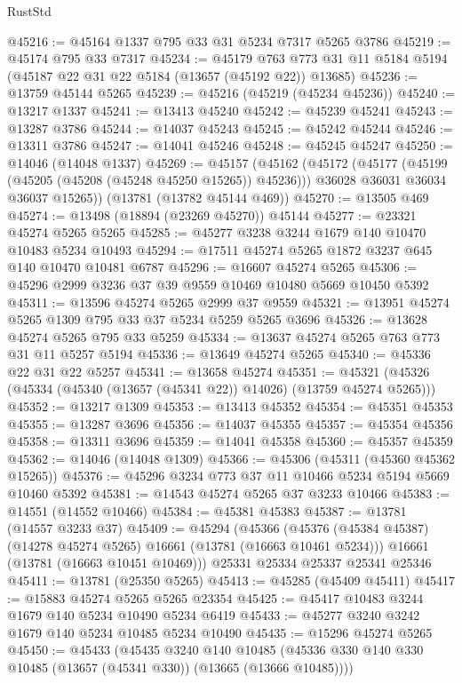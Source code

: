\begin{lexlean}{RustStd}
\begin{coremodule}
@45216 := @45164 @1337 @795 @33 @31 @5234 @7317 @5265 @3786
@45219 := @45174 @795 @33 @7317
@45234 := @45179
    @763
    @773
    @31
    @11
    @5184
    @5194
    (@45187 @22 @31 @22 @5184 (@13657 (@45192 @22)) @13685)
@45236 := @13759 @45144 @5265
@45239 := @45216 (@45219 (@45234 @45236))
@45240 := @13217 @1337
@45241 := @13413 @45240
@45242 := @45239 @45241
@45243 := @13287 @3786
@45244 := @14037 @45243
@45245 := @45242 @45244
@45246 := @13311 @3786
@45247 := @14041 @45246
@45248 := @45245 @45247
@45250 := @14046 (@14048 @1337)
@45269 := @45157
    (@45162
      (@45172
        (@45177 (@45199 (@45205 (@45208 (@45248 @45250 @15265)) @45236)))
        @36028
        @36031
        @36034
        @36037
        @15265))
    (@13781 (@13782 @45144 @469))
@45270 := @13505 @469
@45274 := @13498 (@18894 (@23269 @45270)) @45144
@45277 := @23321 @45274 @5265 @5265
@45285 := @45277 @3238 @3244 @1679 @140 @10470 @10483 @5234 @10493
@45294 := @17511 @45274 @5265 @1872 @3237 @645 @140 @10470 @10481 @6787
@45296 := @16607 @45274 @5265
@45306 := @45296 @2999 @3236 @37 @39 @9559 @10469 @10480 @5669 @10450 @5392
@45311 := @13596 @45274 @5265 @2999 @37 @9559
@45321 := @13951 @45274 @5265 @1309 @795 @33 @37 @5234 @5259 @5265 @3696
@45326 := @13628 @45274 @5265 @795 @33 @5259
@45334 := @13637 @45274 @5265 @763 @773 @31 @11 @5257 @5194
@45336 := @13649 @45274 @5265
@45340 := @45336 @22 @31 @22 @5257
@45341 := @13658 @45274
@45351 := @45321 (@45326 (@45334 (@45340 (@13657 (@45341 @22)) @14026) (@13759 @45274 @5265)))
@45352 := @13217 @1309
@45353 := @13413 @45352
@45354 := @45351 @45353
@45355 := @13287 @3696
@45356 := @14037 @45355
@45357 := @45354 @45356
@45358 := @13311 @3696
@45359 := @14041 @45358
@45360 := @45357 @45359
@45362 := @14046 (@14048 @1309)
@45366 := @45306 (@45311 (@45360 @45362 @15265))
@45376 := @45296 @3234 @773 @37 @11 @10466 @5234 @5194 @5669 @10460 @5392
@45381 := @14543 @45274 @5265 @37 @3233 @10466
@45383 := @14551 (@14552 @10466)
@45384 := @45381 @45383
@45387 := @13781 (@14557 @3233 @37)
@45409 := @45294
    (@45366
      (@45376 (@45384 @45387) (@14278 @45274 @5265) @16661 (@13781 (@16663 @10461 @5234)))
      @16661
      (@13781 (@16663 @10451 @10469)))
    @25331
    @25334
    @25337
    @25341
    @25346
@45411 := @13781 (@25350 @5265)
@45413 := @45285 (@45409 @45411)
@45417 := @15883 @45274 @5265 @5265 @23354
@45425 := @45417 @10483 @3244 @1679 @140 @5234 @10490 @5234 @6419
@45433 := @45277 @3240 @3242 @1679 @140 @5234 @10485 @5234 @10490
@45435 := @15296 @45274 @5265
@45450 := @45433
    (@45435
      @3240
      @140
      @10485
      (@45336 @330 @140 @330 @10485 (@13657 (@45341 @330)) (@13665 (@13666 @10485))))

\end{coremodule}
\end{lexlean}
